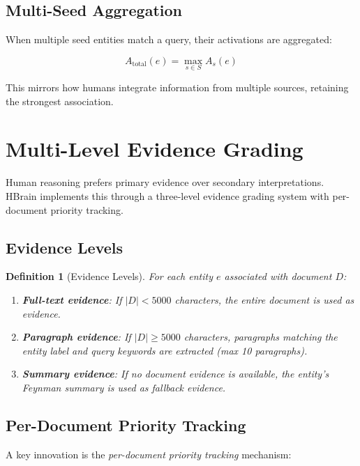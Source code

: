 \documentclass[11pt]{article}
\newtheorem{definition}{Definition}
\begin{document}
\subsection{Multi-Seed Aggregation}

When multiple seed entities match a query, their activations are aggregated:

\begin{equation}
A_{\text{total}}(e) = \max_{s \in S} A_s(e)
\label{eq:aggregation}
\end{equation}

This mirrors how humans integrate information from multiple sources, retaining the strongest association.

\section{Multi-Level Evidence Grading}
\label{sec:evidence}

Human reasoning prefers primary evidence over secondary interpretations. HBrain implements this through a three-level evidence grading system with per-document priority tracking.

\subsection{Evidence Levels}

\begin{definition}[Evidence Levels]
For each entity $e$ associated with document $D$:
\begin{enumerate}
    \item \textbf{Full-text evidence}: If $|D| < 5000$ characters, the entire document is used as evidence.
    \item \textbf{Paragraph evidence}: If $|D| \geq 5000$ characters, paragraphs matching the entity label and query keywords are extracted (max 10 paragraphs).
    \item \textbf{Summary evidence}: If no document evidence is available, the entity's Feynman summary is used as fallback evidence.
\end{enumerate}
\end{definition}

\subsection{Per-Document Priority Tracking}

A key innovation is the \textit{per-document priority tracking} mechanism:
\end{document}

